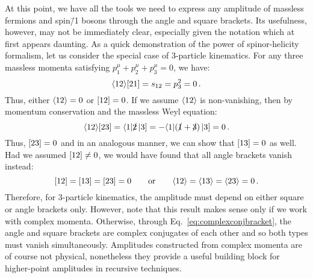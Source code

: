 \documentclass[main.tex]{subfiles}
\begin{document}
At this point, we have all the tools we need to express any amplitude of massless fermions and spin\=/1 bosons through the angle and square brackets. Its usefulness, however, may not be immediately clear, especially given the notation which at first appears daunting. As a quick demonstration of the power of spinor-helicity formalism, let us consider the special case of 3-particle kinematics. For any three massless momenta satisfying $p_1^\mu + p_2^\mu + p_3^\mu = 0$, we have:
\begin{equation}
    \langle 12 \rangle[ 21 ] = s_{12} = p_3^2 = 0\,.
\end{equation}
Thus, either $\langle 12 \rangle = 0$ or $[ 12 ] = 0$. If we assume $\langle 12 \rangle$ is non-vanishing, then by momentum conservation and the massless Weyl equation:
\begin{equation}
    \langle 12 \rangle[ 23 ] = \langle 1|\slashed{2}\left| 3 \right] = -\langle 1|(\slashed{1}+\slashed{3})\left| 3 \right] = 0\,.
\end{equation}
Thus, $[ 23 ] = 0$ and in an analogous manner, we can show that $[ 13 ] = 0$ as well. Had we assumed $[ 12 ] \neq 0$, we would have found that all angle brackets vanish instead:
\begin{equation}
    [ 12 ] = [ 13 ] = [ 23 ] = 0 \qquad \text{or} \qquad \langle 12 \rangle = \langle 13 \rangle = \langle 23 \rangle = 0 \,.
\end{equation}
Therefore, for 3-particle kinematics, the amplitude must depend on either square or angle brackets only. However, note that this result makes sense only if we work with complex momenta. Otherwise, through Eq.~\ref{eq:complexconjbracket}, the angle and square brackets are complex conjugates of each other and so both types must vanish simultaneously. Amplitudes constructed from complex momenta are of course not physical, nonetheless they provide a useful building block for higher-point amplitudes in recursive techniques.
\end{document}
